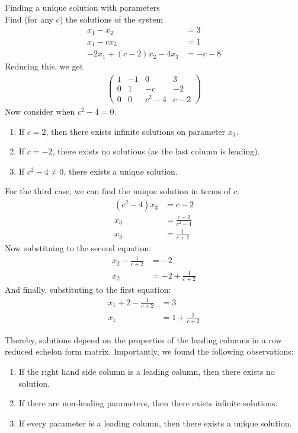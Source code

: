 \documentclass[journal, letterpaper]{IEEEtran}
\begin{document}
    \begin{myboxg}{Finding a unique solution with parameters} \\ 
        Find (for any $c$) the solutions of the system
        \begin{align*}
            x_1 - x_2 &= 3 \\
            x_1 - cx_3 &= 1 \\ 
            -2x_1 + (c-2)x_2 - 4x_3 &= -c-8 
        \end{align*}
        Reducing this, we get
        \begin{align*}
            \begin{pmatrix}
                1 & -1 & 0 & 3 \\
                0 & 1 & -c & -2 \\ 
                0 & 0 & c^2 - 4 & c - 2 
            \end{pmatrix}
        \end{align*}
        Now consider when $c^2 - 4 = 0$.
        \begin{enumerate}
            \item If $c = 2$, then there exists infinite solutions on parameter $x_3$.
            \item If $c = -2$, there exists no solutions (as the last column is leading).
            \item If $c^2 - 4 \ne 0$, there exists a unique solution.
        \end{enumerate}
        For the third case, we can find the unique solution in terms of $c$.
        \begin{align*}
        (c^2 - 4)x_3 &= c - 2 \\ 
        x_3 &= \frac{c - 2}{c^2 - 4} \\ 
        x_3 &= \frac{1}{c + 2}
        \end{align*}
        Now substituing to the second equation:
        \begin{align*}
            x_2 - \frac{1}{c + 2} &= -2 \\
            x_2 &= -2 + \frac{1}{c+2}
        \end{align*}
        And finally, substituting to the first equation:
        \begin{align*}
            x_1 + 2 - \frac{1}{c+2} &= 3 \\ 
            x_1 &= 1 + \frac{1}{c+2}
        \end{align*}
    \end{myboxg}
    Thereby, solutions depend on the properties of the leading columns in a row reduced echelon form matrix. Importantly, we found the following observations:
    \begin{enumerate}
        \item If the right hand side column is a leading column, then there exists no solution.
        \item If there are non-leading parameters, then there exists infinite solutions.
        \item If every parameter is a leading column, then there exists a unique solution.
    \end{enumerate}
\end{document}
